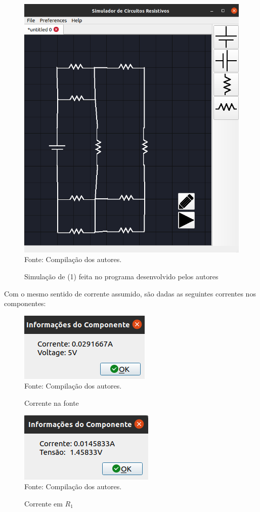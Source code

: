 \documentclass[twocolumn, 10pt,a4paper]{extarticle}
\begin{document}
\begin{figure}[H]
	\caption{Simulação de (1) feita no programa desenvolvido pelos autores} 
	\centering
	\includegraphics[scale=0.2]{circuitsim1}
	\\ Fonte: Compilação dos autores.
\end{figure}

Com o mesmo sentido de corrente assumido, são dadas as seguintes correntes nos componentes:

\begin{figure}[H]
	\caption{Corrente na fonte} 
	\centering
	\includegraphics[scale=0.7]{iv}
	\\ Fonte: Compilação dos autores.
\end{figure}

\begin{figure}[H]
	\caption{Corrente em $R_1$} 
	\centering
	\includegraphics[scale=0.7]{ir1}
	\\ Fonte: Compilação dos autores.
\end{figure}
\end{document}
